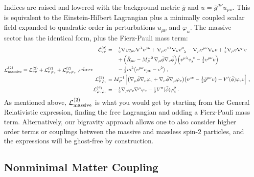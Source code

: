 \documentclass[11pt,a4paper]{article}
\newcommand{\ba}[1]{\begin{align} #1 \end{align}}
\newcommand{\Lcal}{\mathcal{L}}
\newcommand{\MP}{M_P}
\begin{document}
Indices are raised and lowered with the background metric $\bar{g}$ and $u = \bar{g}^{\mu\nu} u_{\mu\nu}$.  This is equivalent to the Einstein-Hilbert Lagrangian plus a minimally coupled scalar field expanded to quadratic order in perturbations $u_{\mu\nu}$ and $\varphi_u$.  The massive sector has the identical form, plus the Fierz-Pauli mass term:
\begin{subequations}\label{eq:model1_L2}
\ba{
	\Lcal^{(2)}_{\rm massive} = \Lcal^{(2)}_{vv}+\Lcal^{(2)}_{v\,\varphi_v}+\Lcal^{(2)}_{\varphi_v\varphi_v}
    \;,
}
where
\ba{
	\Lcal^{(2)}_{vv} 
	& = 
	- \tfrac{1}{2} \nabla_\lambda v_{\mu\nu} \nabla^\lambda v^{\mu\nu} 
	+ \nabla_\mu v^{\nu\lambda} \nabla_\nu v\indices{^\mu_\lambda} 
	- \nabla_\mu v^{\mu\nu} \nabla_\nu v 
	+ \tfrac{1}{2} \nabla_\mu v \nabla^\mu v 
	\\ & \qquad 
	+ \Bigl( \bar{R}_{\mu\nu} - \MP^{-2}\, \nabla_\mu \bar{\phi} \nabla_\nu \bar{\phi} \Bigr) 
	\Bigl( v^{\mu\lambda} v_\lambda^{~\nu} - \tfrac{1}{2} v^{\mu\nu} v \Bigr) 
	\nonumber \\ & \qquad 
	- \tfrac{1}{2} m^2 \bigl( v^{\mu\nu} v_{\mu\nu} - v^2 \bigr) 
	\;, \nonumber \\
	\Lcal^{(2)}_{v\,\varphi_v} 
	& = \MP^{-1} \Bigl[ \bigl( \nabla_\mu \bar{\phi} \nabla_\nu \varphi_v + \nabla_\nu \bar{\phi} \nabla_\mu \varphi_v \bigr) \bigl( v^{\mu\nu} - \tfrac{1}{2} \bar{g}^{\mu\nu} v \bigr) - V'(\bar{\phi}) \varphi_v v \Bigr]  
	\;, \\
	\Lcal^{(2)}_{\varphi_v \varphi_v} 
	& = 
	- \tfrac{1}{2} \nabla_\mu \varphi_v \nabla^\mu \varphi_v 
	- \tfrac{1}{2} V''(\bar{\phi}) \varphi_v^2
	\;.
}
\end{subequations}
As mentioned above, $\Lcal^{(2)}_{\rm massive}$ is what you would get by starting from the General Relativistic expression, finding the free Lagrangian and adding a Fierz-Pauli mass term.  Alternatively, our bigravity approach allows one to also consider higher order terms or couplings between the massive and massless spin-2 particles, and the expressions will be ghost-free by construction.

\subsection{Nonminimal Matter Coupling}
\label{sub:nonminimal_theory}
\end{document}
